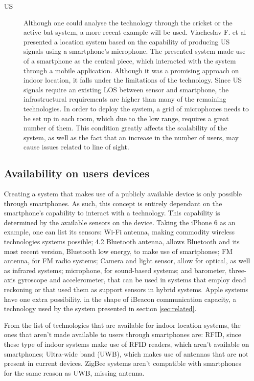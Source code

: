 \begin{description}
 
 
 
\item[\ac{US}] Although one could analyse the technology through the cricket or the active bat system, a more recent example will be used. 
Viacheslav F. et al \cite{us_ex} presented a location system based on the capability of producing \ac{US} signals using a smartphone's microphone. The presented system made use of a smartphone as the central piece, which interacted with the system through a mobile application. Although it was a promising approach on indoor location, it falls under the limitations of the technology. Since \ac{US} signals require an existing \ac{LOS} between sensor and smartphone, the infrastructural requirements are higher than many of the remaining technologies. In order to deploy the system, a grid of microphones needs to be set up in each room, which due to the low range, requires a great number of them. This condition greatly affects the scalability of the system, as well as the fact that an increase in the number of users, may cause issues related to line of sight. 
\end{description} 
 
 
 
 
\subsection{Availability on users devices} 
\label{subsec:availability} 
 
 
Creating a system that makes use of a publicly available device is only possible through smartphones. As such, this concept is entirely dependant on the smartphone's capability to interact with a technology. This capability is determined by the available sensors on the device. 
Taking the iPhone 6 as an example, one can list its sensors\cite{iphone}: Wi-Fi antenna, making commodity wireless technologies systems possible; 4.2 Bluetooth antenna, allows Bluetooth and its most recent version, Bluetooth low energy, to make use of smartphones; FM antenna, for FM radio systems; Camera and light sensor, allow for optical, as well as infrared systems; microphone, for sound-based systems; and barometer, three-axis gyroscope and accelerometer, that can be used in systems that employ dead reckoning or that used them as support sensors in hybrid systems. Apple systems have one extra possibility, in the shape of iBeacon communication capacity, a technology used by the system presented in section \ref{sec:related}. 
 
 
From the list of technologies that are available for indoor location systems, the ones that aren't made available to users through smartphones are: RFID, since these type of indoor systems make use of \ac{RFID} readers, which aren't available on smartphones; Ultra-wide band (UWB), which makes use of antennas that are not present in current devices. ZigBee systems aren't compatible with smartphones for the same reason as UWB, missing antenna. 
 
